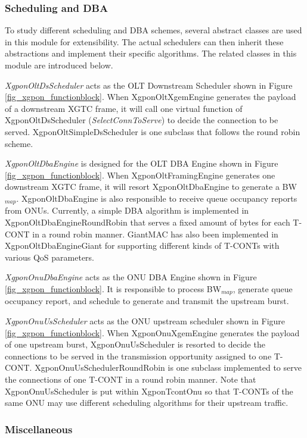 \subsubsection{Scheduling and DBA}

To study different scheduling and DBA schemes, several abstract
classes are used in this module for extensibility. The actual
schedulers can then inherit these abstractions and implement their
specific algorithms. The related classes in this module are
introduced below.

\emph{XgponOltDsScheduler} acts as the OLT Downstream Scheduler
shown in Figure \ref{fig_xgpon_functionblock}. When
XgponOltXgemEngine generates the payload of a downstream XGTC
frame, it will call one virtual function of XgponOltDsScheduler
(\emph{SelectConnToServe}) to decide the connection to be served.
XgponOltSimpleDsScheduler is one subclass that follows the round
robin scheme.

\emph{XgponOltDbaEngine} is designed for the OLT DBA Engine shown
in Figure \ref{fig_xgpon_functionblock}. When
XgponOltFramingEngine generates one downstream XGTC frame, it will
resort XgponOltDbaEngine to generate a BW$_{map}$. XgponOltDbaEngine 
is also responsible to receive queue occupancy reports from ONUs. 
Currently, a simple DBA algorithm is implemented in 
XgponOltDbaEngineRoundRobin that serves a fixed amount of bytes 
for each T-CONT in a round robin manner. GiantMAC \cite{leligou06GiantMACforGPON}
has also been implemented in XgponOltDbaEngineGiant for supporting different
kinds of T-CONTs with various QoS parameters.


\emph{XgponOnuDbaEngine} acts as the ONU DBA Engine shown in
Figure \ref{fig_xgpon_functionblock}. It is responsible to process
BW$_{map}$, generate queue occupancy report, and schedule to
generate and transmit the upstream burst.

\emph{XgponOnuUsScheduler} acts as the ONU upstream scheduler
shown in Figure \ref{fig_xgpon_functionblock}. When
XgponOnuXgemEngine generates the payload of one upstream burst,
XgponOnuUsScheduler is resorted to decide the connections to be
served in the transmission opportunity assigned to one T-CONT.
XgponOnuUsSchedulerRoundRobin is one subclass implemented to serve
the connections of one T-CONT in a round robin manner. Note that
XgponOnuUsScheduler is put within XgponTcontOnu so that T-CONTs of
the same ONU may use different scheduling algorithms for their
upstream traffic.



\subsubsection{Miscellaneous}

